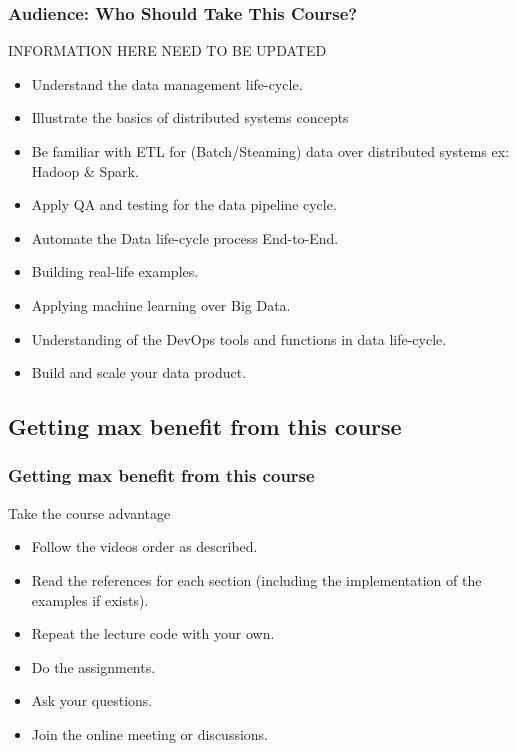 \begin{frame}
\frametitle{Audience: Who Should Take This Course?}
INFORMATION HERE NEED TO BE UPDATED
\begin{itemize}
	\item<1-> Understand the data management life-cycle. \pause
	\item<2-> Illustrate the basics of distributed systems concepts \pause
	\item<3-> Be familiar with ETL for (Batch/Steaming) data over distributed systems ex: Hadoop \& Spark.  \pause
	\item<4-> Apply QA and testing for the data pipeline cycle.
	\item<5-> Automate the Data life-cycle process End-to-End. \pause
	\item<6-> Building real-life examples. \pause
	\item<7-> Applying machine learning over Big Data. \pause
	\item<8-> Understanding of the DevOps tools and functions in data life-cycle. \pause
	\item<9-> Build and scale your data product. \pause
\end{itemize}

\end{frame}


\subsection{Getting max benefit from this course}

\begin{frame}
\frametitle{Getting max benefit from this course}
\begin{block}{Take the course advantage}
\begin{itemize}
	\item<1-> Follow the videos order as described. \pause
	\item<2-> Read the references for each section (including the implementation of the examples if exists). \pause
	\item<3-> Repeat the lecture code with your own.  \pause
	\item<4-> Do the assignments.\pause
	\item<5-> Ask your questions. \pause
	\item<6-> Join the online meeting or discussions. \pause
\end{itemize}
\end{block}

\end{frame}

